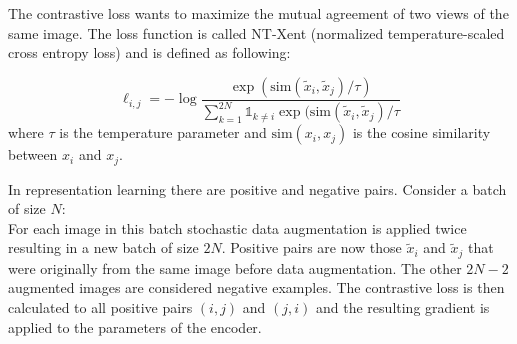 \documentclass{article}
\begin{document}
\noindent The contrastive loss wants to maximize the mutual agreement of two views of the same image. 
The loss function is called NT-Xent (normalized temperature-scaled cross entropy loss) and is defined as following:

\begin{equation}
    \ell_{i,j} = -\log \frac{\exp(\mathrm{sim}(\tilde{x}_i, \tilde{x}_j)/\tau)}{\sum_{k=1}^{2N} \mathds{1}_{k \neq i} \exp(\mathrm{sim}(\tilde{x}_i, \tilde{x}_j)/\tau}
\end{equation}
where $\tau$ is the temperature parameter and $\mathrm{sim}(x_i, x_j)$ is the cosine similarity between $x_i$ and $x_j$.

\noindent In representation learning there are positive and negative pairs. Consider a batch of size $N$: \\
For each image in this batch stochastic data augmentation is applied twice resulting in a new batch of size $2N$. 
Positive pairs are now those $\tilde x_i$ and $\tilde x_j$ that were originally from the same image before data augmentation. The other $2N-2$ augmented images are considered negative examples. The contrastive loss is then calculated to all positive pairs $(i,j)$ and $(j,i)$ and
the resulting gradient is applied to the parameters of the encoder.
\end{document}
